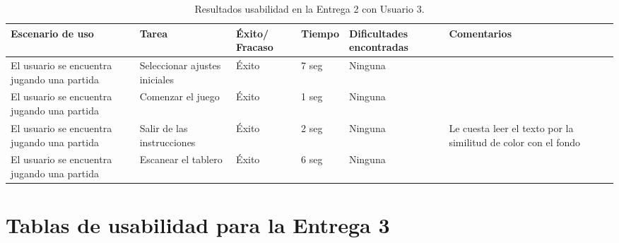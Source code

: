 \begin{table}[h]
  \begin{center}
    \begin{tabular}{|p{2.5cm}|p{1.75cm}|p{1.25cm}|p{1.25cm}|p{2.75cm}|p{3.5cm}|}

      \hline
        \rowcolor{Gray} \textbf{Escenario de uso}
        & \textbf{Tarea}
        & \textbf{Éxito/ Fracaso}
        & \textbf{Tiempo}
        & \textbf{Dificultades encontradas}
        & \textbf{Comentarios}\\

      \hline
      El usuario se encuentra jugando una partida
      & Seleccionar ajustes iniciales
      & Éxito
      & 7 seg
      & Ninguna
      &\\

      \hline
      El usuario se encuentra jugando una partida
      & Comenzar el juego
      & Éxito
      & 1 seg
      & Ninguna
      &\\

      \hline
      El usuario se encuentra jugando una partida
      & Salir de las instrucciones
      & Éxito
      & 2 seg
      & Ninguna
      & Le cuesta leer el texto por la similitud de color con el fondo\\

      \hline
      El usuario se encuentra jugando una partida
      & Escanear el tablero
      & Éxito
      & 6 seg
      & Ninguna
      &\\

      \hline

    \end{tabular}

    \caption{Resultados usabilidad en la Entrega 2 con Usuario 3.}
    \label{tabla-entrega-2-usuario3}

  \end{center}
\end{table}

\FloatBarrier


\section{Tablas de usabilidad para la Entrega 3} \label{tablas-usabilidad-entrega-3}

